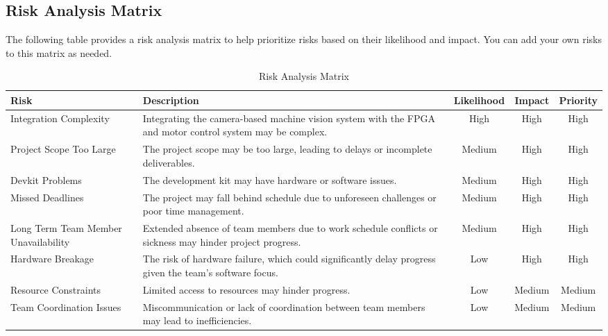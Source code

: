 \documentclass{article}
\begin{document}
\subsection{Risk Analysis Matrix}
The following table provides a risk analysis matrix to help prioritize risks based on their likelihood and impact. You can add your own risks to this matrix as needed.

\begin{table}[H]
\centering
\caption{Risk Analysis Matrix}
\label{tab:risk_matrix}
\begin{tabularx}{\textwidth}{|p{}|X|c|c|c|}
    \hline
    \textbf{Risk} & \textbf{Description} & \textbf{Likelihood} & \textbf{Impact} & \textbf{Priority} \\
    \hline
    Integration Complexity & Integrating the camera-based machine vision system with the FPGA and motor control system may be complex. & High & High & High \\
    \hline
    Project Scope Too Large & The project scope may be too large, leading to delays or incomplete deliverables. & Medium & High & High \\
    \hline
    Devkit Problems & The development kit may have hardware or software issues. & Medium & High & High \\
    \hline
    Missed Deadlines & The project may fall behind schedule due to unforeseen challenges or poor time management. & Medium & High & High \\
    \hline
    Long Term Team Member Unavailability & Extended absence of team members due to work schedule conflicts or sickness may hinder project progress. & Medium & High & High \\
    \hline
    Hardware Breakage & The risk of hardware failure, which could significantly delay progress given the team’s software focus. & Low & High & High \\
    \hline
    Resource Constraints & Limited access to resources may hinder progress. & Low & Medium & Medium \\
    \hline
    Team Coordination Issues & Miscommunication or lack of coordination between team members may lead to inefficiencies. & Low & Medium & Medium \\
    \hline
\end{tabularx}
\end{table}
\end{document}
